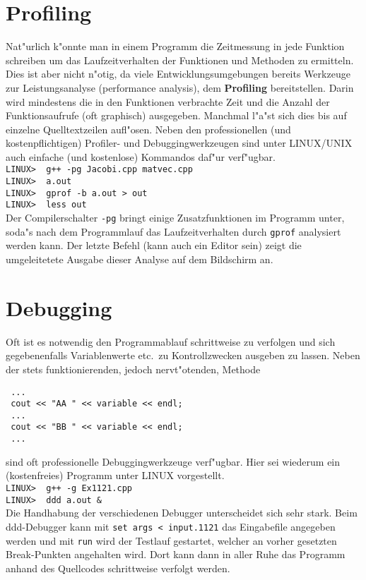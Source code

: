 \section{Profiling}
\label{p:13.3}
%
Nat"urlich k"onnte man in einem Programm die Zeitmessung in jede 
Funktion schreiben um das Laufzeitverhalten der Funktionen und Methoden 
zu ermitteln. 
Dies ist aber nicht n"otig, da viele Entwicklungsumgebungen 
bereits Werkzeuge zur Leistungsanalyse (performance analysis), 
dem \textbf{Profiling} bereitstellen. 
Darin wird mindestens die in den Funktionen verbrachte Zeit und die 
Anzahl der Funktionsaufrufe (oft graphisch) ausgegeben. 
Manchmal l"a"st sich dies bis auf einzelne Quelltextzeilen aufl"osen. 
Neben den professionellen (und kostenpflichtigen) Profiler- und 
Debuggingwerkzeugen sind unter LINUX/UNIX  auch 
einfache (und kostenlose) Kommandos daf"ur verf"ugbar.
\\[0.5ex]
\verb|LINUX>  g++ -pg Jacobi.cpp matvec.cpp|	\\
\verb|LINUX>  a.out|	\\
\verb|LINUX>  gprof -b a.out > out|	\\
\verb|LINUX>  less out|	
\\[0.5ex]
Der Compilerschalter \verb|-pg| bringt einige Zusatzfunktionen im 
Programm unter, soda"s nach dem Programmlauf das Laufzeitverhalten 
durch \verb|gprof| analysiert werden kann. 
Der letzte Befehl (kann auch ein Editor sein) 
zeigt die umgeleitetete Ausgabe dieser Analyse auf dem Bildschirm an. 
%
%
\section{Debugging}
\label{sec:11.4}
%
Oft ist es notwendig den Programmablauf schrittweise zu verfolgen und sich 
gegebenenfalls Variablenwerte etc.\  zu Kontrollzwecken ausgeben zu lassen. 
Neben der stets funktionierenden, jedoch nervt"otenden, Methode

\verb| ...|	\\
\verb| cout << "AA " << variable << endl; |	\\
\verb| ...|	\\
\verb| cout << "BB " << variable << endl; |	\\
\verb| ...|

sind oft professionelle Debuggingwerkzeuge verf"ugbar. 
Hier sei wiederum ein (kostenfreies) Programm unter LINUX vorgestellt. 
\\[0.5ex]
\verb|LINUX>  g++ -g Ex1121.cpp|	\\
\verb|LINUX>  ddd a.out &|	
\\[0.5ex]
Die Handhabung der verschiedenen Debugger unterscheidet sich sehr stark. 
Beim ddd-Debugger kann mit \verb|set args < input.1121| das 
Eingabefile angegeben werden und mit \verb|run| wird 
der Testlauf gestartet, welcher an vorher gesetzten Break-Punkten 
angehalten wird. Dort kann dann in aller Ruhe das Programm anhand des 
Quellcodes schrittweise verfolgt werden. 
 
